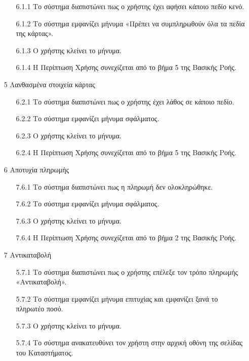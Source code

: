 \documentclass[12pt,a4paper,twoside]{book}
\begin{document}
\begin{enumerate}
\begin{enumerate}
          \item[6.1.1 ] Το σύστημα διαπιστώνει πως ο χρήστης έχει αφήσει κάποιο πεδίο κενό. %
          \item[6.1.2 ] Το σύστημα εμφανίζει μήνυμα «Πρέπει να συμπληρωθούν όλα τα πεδία της κάρτας». %
          \item[6.1.3 ] Ο χρήστης κλείνει το μήνυμα. %
          \item[6.1.4 ] Η Περίπτωση Χρήσης συνεχίζεται από το βήμα 5 της Βασικής Ροής. %
        \end{enumerate}
  \item[5 ] Λανθασμένα στοιχεία κάρτας %
        \begin{enumerate}
          \item[6.2.1 ] Το σύστημα διαπιστώνει πως ο χρήστης έχει λάθος σε κάποιο πεδίο. %
          \item[6.2.2 ] Το σύστημα εμφανίζει μήνυμα σφάλματος. %
          \item[6.2.3 ] Ο χρήστης κλείνει το μήνυμα. %
          \item[6.2.4 ] Η Περίπτωση Χρήσης συνεχίζεται από το βήμα 5 της Βασικής Ροής. %
        \end{enumerate}
  \item[6 ] Αποτυχία πληρωμής %
        \begin{enumerate}
          \item[7.6.1 ] Το σύστημα διαπιστώνει πως η πληρωμή δεν ολοκληρώθηκε. %
          \item[7.6.2 ] Το σύστημα εμφανίζει μήνυμα σφάλματος. %
          \item[7.6.3 ] Ο χρήστης κλείνει το μήνυμα. %
          \item[7.6.4 ] Η Περίπτωση Χρήσης συνεχίζεται από το βήμα 2 της Βασικής Ροής. %
        \end{enumerate}
  \item[7 ] Αντικαταβολή %
        \begin{enumerate}
          \item[5.7.1 ] Το σύστημα διαπιστώνει πως ο χρήστης επέλεξε τον τρόπο πληρωμής «Αντικαταβολή». %
          \item[5.7.2 ] Το σύστημα εμφανίζει μήνυμα επιτυχίας και εμφανίζει ξανά το πληρωτέο ποσό. %
          \item[5.7.3 ] Ο χρήστης κλείνει το μήνυμα. %
          \item[5.7.4 ] Το σύστημα ανακατευθύνει τον χρήστη στην αρχική οθόνη της σελίδας του Καταστήματος. %
        \end{enumerate}
\end{enumerate}
\end{document}
